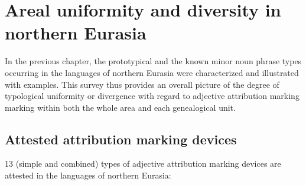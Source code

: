 
\chapter[Areal uniformity and diversity]{Areal uniformity and diversity in northern Eurasia}\label{areality}
In the previous chapter, the prototypical and the known minor noun phrase types occurring in the languages of northern Eurasia were characterized and illustrated with examples. This survey thus provides an overall picture of the degree of typological uniformity or divergence with regard to adjective attribution marking marking within both the whole area and each genealogical unit.

\section{Attested attribution marking devices}
13 (simple and combined) types of adjective attribution marking devices are attested in the languages of northern Eurasia:
